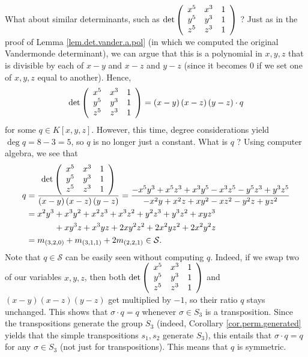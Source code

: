 \begin{example}
What about similar determinants, such as $\det\left(
\begin{array}
[c]{ccc}%
x^{5} & x^{3} & 1\\
y^{5} & y^{3} & 1\\
z^{5} & z^{3} & 1
\end{array}
\right)  $ ? Just as in the proof of Lemma \ref{lem.det.vander.a.pol} (in
which we computed the original Vandermonde determinant), we can argue that
this is a polynomial in $x,y,z$ that is divisible by each of $x-y$ and $x-z$
and $y-z$ (since it becomes $0$ if we set one of $x,y,z$ equal to another).
Hence,%
\[
\det\left(
\begin{array}
[c]{ccc}%
x^{5} & x^{3} & 1\\
y^{5} & y^{3} & 1\\
z^{5} & z^{3} & 1
\end{array}
\right)  =\left(  x-y\right)  \left(  x-z\right)  \left(  y-z\right)  \cdot q
\]
for some $q\in K\left[  x,y,z\right]  $. However, this time, degree
considerations yield $\deg q=8-3=5$, so $q$ is no longer just a constant. What
is $q$ ? Using computer algebra, we see that%
\begin{align*}
q  &  =\dfrac{\det\left(
\begin{array}
[c]{ccc}%
x^{5} & x^{3} & 1\\
y^{5} & y^{3} & 1\\
z^{5} & z^{3} & 1
\end{array}
\right)  }{\left(  x-y\right)  \left(  x-z\right)  \left(  y-z\right)
}=\dfrac{-x^{5}y^{3}+x^{5}z^{3}+x^{3}y^{5}-x^{3}z^{5}-y^{5}z^{3}+y^{3}z^{5}%
}{-x^{2}y+x^{2}z+xy^{2}-xz^{2}-y^{2}z+yz^{2}}\\
&  =x^{2}y^{3}+x^{3}y^{2}+x^{2}z^{3}+x^{3}z^{2}+y^{2}z^{3}+y^{3}z^{2}%
+xyz^{3}\\
&  \ \ \ \ \ \ \ \ \ \ +xy^{3}z+x^{3}yz+2xy^{2}z^{2}+2x^{2}yz^{2}+2x^{2}%
y^{2}z\\
&  =m_{\left(  3,2,0\right)  }+m_{\left(  3,1,1\right)  }+2m_{\left(
2,2,1\right)  }\in\mathcal{S}.
\end{align*}
Note that $q\in\mathcal{S}$ can be easily seen without computing $q$. Indeed,
if we swap two of our variables $x,y,z$, then both $\det\left(
\begin{array}
[c]{ccc}%
x^{5} & x^{3} & 1\\
y^{5} & y^{3} & 1\\
z^{5} & z^{3} & 1
\end{array}
\right)  $ and $\left(  x-y\right)  \left(  x-z\right)  \left(  y-z\right)  $
get multiplied by $-1$, so their ratio $q$ stays unchanged. This shows that
$\sigma\cdot q=q$ whenever $\sigma\in S_{3}$ is a transposition. Since the
transpositions generate the group $S_{3}$ (indeed, Corollary
\ref{cor.perm.generated} yields that the simple transpositions $s_{1},s_{2}$
generate $S_{3}$), this entails that $\sigma\cdot q=q$ for any $\sigma\in
S_{3}$ (not just for transpositions). This means that $q$ is symmetric.


\end{example}
